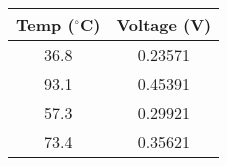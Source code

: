 \begin{tabular}{|c|c|}
    \hline
    \textbf{Temp ($^{\circ}$C)} & \textbf{Voltage (V)} \\
    \hline
    36.8 & 0.23571 \\
    93.1 & 0.45391 \\
    57.3 & 0.29921 \\
    73.4 & 0.35621 \\
    \hline
\end{tabular}
